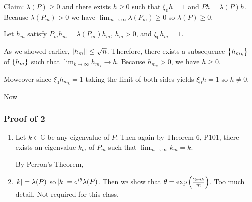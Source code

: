 \documentclass{article}
\newcommand{\CC}{\mathbb{C}}
\begin{document}
Claim: \(\lambda(P) \geq 0\) and there exists \(h \geq 0\) such that \(\xi_0h =1\) and \(Ph = \lambda(P)h\).
Because \(\lambda(P_m) > 0\) we have \(\lim_{m \to \infty} \lambda(P_m) \geq 0 \) so \(\lambda(P) \geq 0\).

Let \(h_m\) satisfy \(P_mh_m = \lambda(P_m)h_m\), \(h_m > 0\), and \(\xi_0h_m = 1\).

As we showed earlier, \(\norm{h_m} \leq \sqrt{n}\).
Therefore, there exists a subsequence \(\set{h_{m_k}}\) of \(\set{h_m}\) such that \(\lim_{k \to \infty} h_{m_k} \to h\).
Because \(h_{m_k} > 0\), we have \(h \geq 0\).

Moweover since \(\xi_0h_{m_k} = 1 \) taking the limit of both sides yields \( \xi_0h=1\) so \(h \neq 0\).

Now
\begin{center}
\end{center}


\subsubsection{Proof of 2}

\begin{enumerate}[label=(\roman*)]
\item Let \(k \in \CC\) be any eigenvalue of \(P\). Then again by Theorem 6, P101, there exists an eigenvalue \(k_m\) of \(P_m\) such that \(\lim_{m \to \infty} k_m = k\).

  By Perron's Theorem,
  \begin{center}
  \end{center}

\item \(\abs{k} = \lambda(P)\) so \(\abs{k} = e^{i\theta} \lambda(P)\).
  Then we show that \(\theta = \exp\del{\frac{2\pi i k}{m}}\).
  Too much detail. Not required for this class.
\end{enumerate}
\end{document}

